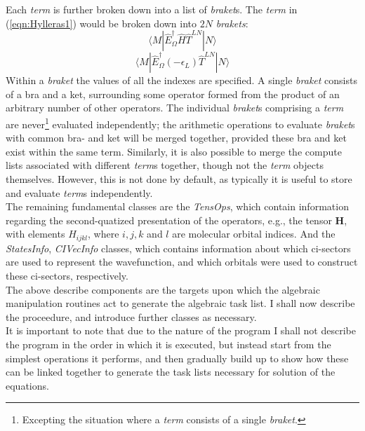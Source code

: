 \documentclass[12pt]{article}
\begin{document}
\noindent Each \emph{term} is further broken down into a list of \emph{braket}s. The \emph{term} 
in (\ref{eqn:Hylleras1}) would be broken down into $2N$ \emph{brakets}: 
\begin{equation}
\langle M | \hat{E}^{\dagger}_{\Omega} \hat{H} \hat{T}^{LN} | N \rangle  
\end{equation}
\begin{equation}
\langle M | \hat{E}^{\dagger}_{\Omega} (-\epsilon_{L}) \hat{T}^{LN} | N \rangle  
\end{equation}
\noindent Within a \emph{braket} the values of all the indexes are specified.
A single \emph{braket} consists of a bra and a ket, surrounding some operator
formed from the product of an arbitrary number of other operators.  The
individual \emph{braket}s comprising a \emph{term} are never\footnote{Excepting
the situation where a \emph{term} consists of a single \emph{braket}.}
evaluated independently; the arithmetic operations to evaluate \emph{braket}s
with common bra- and ket will be merged together, provided these bra and ket
exist within the same term. Similarly, it is also possible to merge the compute
lists associated with different \emph{term}s together, though not the
\emph{term} objects themselves. However, this is not done by default, as
typically it is useful to store and evaluate \emph{term}s independently.\\

\noindent The remaining fundamental classes are the \emph{TensOps}, which contain
information regarding the second-quatized presentation of the operators, e.g.,
the tensor $\mathbf{H}$, with elements $H_{ijkl}$, where $i, j, k$ and $l$ are
molecular orbital indices. And the \emph{StatesInfo}, \emph{CIVecInfo}
classes, which contains information about which ci-sectors are used to represent the 
wavefunction, and which orbitals were used to construct these ci-sectors,  respectively.\\

\noindent The above describe components are the targets upon which the 
algebraic manipulation routines act to generate the algebraic task list.
I shall now describe the proceedure, and introduce further classes as necessary.\\

\noindent It is important to note that due to the nature of the program I shall not describe the
program in the order in which it is executed, but instead start from the simplest operations it
performs, and then gradually build up to show how these can be linked together to
generate the task lists necessary for solution of the equations.
\end{document}
